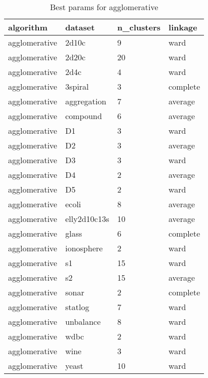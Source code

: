 \begin{table}[H]
\centering
\caption{Best params for agglomerative}
\label{tab:params:agglomerative}
\begin{tabular}{|l|l|l|l|}
\hline
algorithm & dataset & n\_clusters & linkage \\
\hline
agglomerative & 2d10c & 9 & ward \\
\hline
agglomerative & 2d20c & 20 & ward \\
\hline
agglomerative & 2d4c & 4 & ward \\
\hline
agglomerative & 3spiral & 3 & complete \\
\hline
agglomerative & aggregation & 7 & average \\
\hline
agglomerative & compound & 6 & average \\
\hline
agglomerative & D1 & 3 & ward \\
\hline
agglomerative & D2 & 3 & average \\
\hline
agglomerative & D3 & 3 & ward \\
\hline
agglomerative & D4 & 2 & average \\
\hline
agglomerative & D5 & 2 & ward \\
\hline
agglomerative & ecoli & 8 & average \\
\hline
agglomerative & elly2d10c13s & 10 & average \\
\hline
agglomerative & glass & 6 & complete \\
\hline
agglomerative & ionosphere & 2 & ward \\
\hline
agglomerative & s1 & 15 & ward \\
\hline
agglomerative & s2 & 15 & average \\
\hline
agglomerative & sonar & 2 & complete \\
\hline
agglomerative & statlog & 7 & ward \\
\hline
agglomerative & unbalance & 8 & ward \\
\hline
agglomerative & wdbc & 2 & ward \\
\hline
agglomerative & wine & 3 & ward \\
\hline
agglomerative & yeast & 10 & ward \\
\hline
\end{tabular}
\end{table}